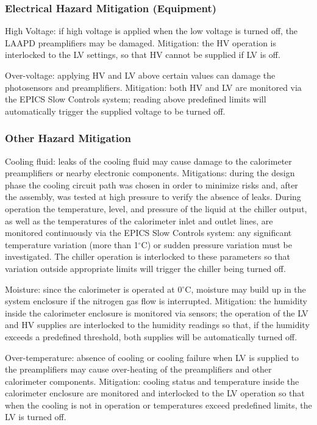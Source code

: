 \subsubsection{Electrical Hazard Mitigation (Equipment)}

High Voltage: if high voltage is applied when the low voltage is turned off, the LAAPD 
preamplifiers may be damaged. Mitigation: the HV operation is interlocked to the LV settings, 
so that HV cannot be supplied if LV is off.

Over-voltage: applying HV and LV above certain values can damage the photosensors and 
preamplifiers. Mitigation: both HV and LV are monitored via the EPICS Slow Controls system; 
reading above predefined limits will automatically trigger the supplied voltage to be turned 
off.

\subsubsection{Other Hazard Mitigation}

Cooling fluid: leaks of the cooling fluid may cause damage to the calorimeter preamplifiers 
or nearby electronic components. Mitigations: during the design phase the cooling circuit 
path was chosen in order to minimize risks and, after the assembly, was tested at high 
pressure to verify the absence of leaks. During operation the temperature, level, and pressure 
of the liquid at the chiller output, as well as the temperatures of the calorimeter inlet and 
outlet lines, are monitored continuously via the EPICS Slow Controls system: any significant 
temperature variation (more than 1$^{\circ}$C) or sudden pressure variation must be investigated. 
The chiller operation is interlocked to these parameters so that variation outside appropriate 
limits will trigger the chiller being turned off.

Moisture: since the calorimeter is operated at 0$^{\circ}$C, moisture may build up in the 
system enclosure if the nitrogen gas flow is interrupted. Mitigation: the humidity inside the 
calorimeter enclosure is monitored via sensors; the operation of the LV and HV supplies are 
interlocked to the humidity readings so that, if the humidity exceeds a predefined threshold, 
both supplies will be automatically turned off.

Over-temperature: absence of cooling or cooling failure when LV is supplied to the preamplifiers 
may cause over-heating of the preamplifiers and other calorimeter components. Mitigation: cooling 
status and temperature inside the calorimeter enclosure are monitored and interlocked to the LV 
operation so that when the cooling is not in operation or temperatures exceed predefined limits, 
the LV is turned off.

